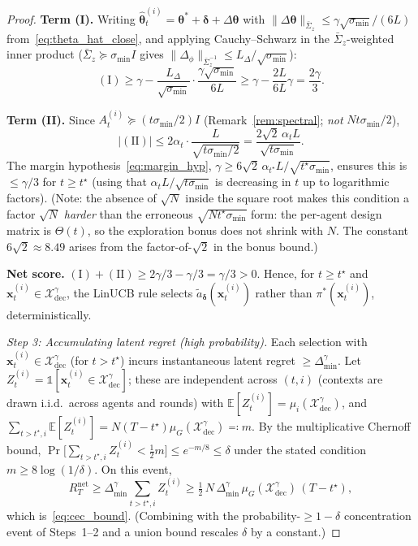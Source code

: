 \documentclass[11pt]{article}
\begin{document}
\begin{proof}
\textbf{Term (I).}
Writing $\widehat{\bm{\theta}}_t^{(i)}=\bm{\theta}^{\!*}+\bm{\delta}+\Delta\bm{\theta}$
with $\|\Delta\bm{\theta}\|_{\bar{\Sigma}_z}\leq\gamma\sqrt{\sigma_{\min}}/(6L)$
from~\eqref{eq:theta_hat_close}, and applying Cauchy--Schwarz
in the $\bar{\Sigma}_z$-weighted inner product
($\bar{\Sigma}_z\succeq\sigma_{\min}I$ gives
$\|\Delta_\phi\|_{\bar{\Sigma}_z^{-1}}\leq L_\Delta/\sqrt{\sigma_{\min}}$):
\[
(\mathrm{I})\geq\gamma-\frac{L_\Delta}{\sqrt{\sigma_{\min}}}
\cdot\frac{\gamma\sqrt{\sigma_{\min}}}{6L}\geq\gamma-\frac{2L}{6L}\gamma
=\frac{2\gamma}{3}.
\]

\textbf{Term (II).}
Since $A_t^{(i)}\succeq(t\sigma_{\min}/2)I$ (Remark~\ref{rem:spectral};
\emph{not} $Nt\sigma_{\min}/2$),
\[
|(\mathrm{II})|\leq 2\alpha_t\cdot\frac{L}{\sqrt{t\sigma_{\min}/2}}
=\frac{2\sqrt{2}\,\alpha_t L}{\sqrt{t\sigma_{\min}}}.
\]
The margin hypothesis~\eqref{eq:margin_hyp},
$\gamma\geq 6\sqrt{2}\,\alpha_{t^\star}L/\sqrt{t^\star\sigma_{\min}}$,
ensures this is $\leq\gamma/3$ for $t\geq t^\star$ (using that
$\alpha_t L/\sqrt{t\sigma_{\min}}$ is decreasing in $t$ up to
logarithmic factors).
(Note: the absence of $\sqrt N$ inside the square root makes this
condition a factor $\sqrt N$ \emph{harder} than the erroneous
$\sqrt{Nt^\star\sigma_{\min}}$ form: the per-agent design matrix is
$\Theta(t)$, so the exploration bonus does not shrink with $N$.  The
constant $6\sqrt 2\approx 8.49$ arises from the factor-of-$\sqrt 2$ in
the bonus bound.)

\textbf{Net score.}
$(\mathrm{I})+(\mathrm{II})\geq 2\gamma/3-\gamma/3=\gamma/3>0$.
Hence, for $t\geq t^\star$ and $\bm{x}_t^{(i)}\in\mathcal{X}_{\mathrm{dec}}^\gamma$,
the LinUCB rule selects $\tilde{a}_{\bm{\delta}}(\bm{x}_t^{(i)})$
rather than $\pi^{\!*}(\bm{x}_t^{(i)})$, deterministically.

\textit{Step 3: Accumulating latent regret (high probability).}
Each selection with $\bm{x}_t^{(i)}\in\mathcal{X}_{\mathrm{dec}}^\gamma$
(for $t>t^\star$) incurs instantaneous latent regret
$\geq\Delta_{\min}^\gamma$.  Let
$Z_t^{(i)}=\mathbb{1}[\bm{x}_t^{(i)}\in\mathcal{X}_{\mathrm{dec}}^\gamma]$;
these are independent across $(t,i)$ (contexts are drawn i.i.d.\
across agents and rounds) with
$\mathbb{E}[Z_t^{(i)}]=\mu_i(\mathcal{X}_{\mathrm{dec}}^\gamma)$, and
$\sum_{t>t^\star,i}\mathbb{E}[Z_t^{(i)}]
=N(T-t^\star)\mu_G(\mathcal{X}_{\mathrm{dec}}^\gamma)\eqqcolon m$.
By the multiplicative Chernoff bound,
$\Pr\bigl[\sum_{t>t^\star,i}Z_t^{(i)}<\tfrac12 m\bigr]\leq e^{-m/8}\leq\delta$
under the stated condition $m\geq 8\log(1/\delta)$.  On this event,
\[
R_T^{\mathrm{net}}\geq\Delta_{\min}^\gamma\sum_{t>t^\star,i}Z_t^{(i)}
\geq\tfrac12\,N\,\Delta_{\min}^\gamma\,\mu_G(\mathcal{X}_{\mathrm{dec}}^\gamma)\,(T-t^\star),
\]
which is~\eqref{eq:cec_bound}.  (Combining with the
probability-$\geq 1-\delta$ concentration event of Steps~1--2 and a
union bound rescales $\delta$ by a constant.)
\end{proof}
\end{document}
